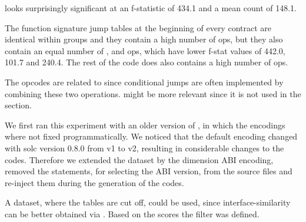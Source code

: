 \documentclass[../main.tex]{subfiles}
\begin{document}
 looks surprisingly significant at an f-statistic of 434.1 and a mean count of 148.1.

The  function signature jump tables at the beginning of every contract are identical within groups and they contain a high number of  ops, but they also contain an equal number of ,  and  ops, which have lower f-stat values of 442.0, 101.7 and 240.4. The rest of the code does also contains a high number of  ops.

The  opcodes are related to  since conditional jumps are often implemented by combining these two operations.  might be more relevant since it is not used in the  section.

We first ran this experiment with an older version of \n{\solcts}, in which the  encodings where not fixed programmatically. We noticed that the default encoding changed with solc version 0.8.0 from v1 to v2, resulting in considerable changes to the codes. Therefore we extended the dataset by the dimension ABI encoding, removed the  statements, for selecting the ABI version, from the source files and re-inject them during the generation of the codes.

A dataset, where the  tables are cut off, could be used, since interface-similarity can be better obtained via  .
Based on the scores the   filter was defined.
\end{document}
